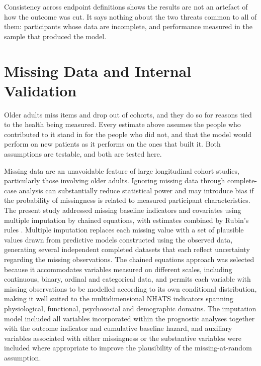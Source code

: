 \medskip
{}

\medskip
\noindent Consistency across endpoint definitions shows the results are not an artefact of how the outcome was cut. It says nothing about the two threats common to all of them: participants whose data are incomplete, and performance measured in the sample that produced the model.

\section{Missing Data and Internal Validation}
\label{sec:internal_validation_results}

\noindent Older adults miss items and drop out of cohorts, and they do so for reasons tied to the health being measured. Every estimate above assumes the people who contributed to it stand in for the people who did not, and that the model would perform on new patients as it performs on the ones that built it. Both assumptions are testable, and both are tested here.

\noindent Missing data are an unavoidable feature of large longitudinal cohort studies, particularly those involving older adults. Ignoring missing data through complete-case analysis can substantially reduce statistical power and may introduce bias if the probability of missingness is related to measured participant characteristics. The present study addressed missing baseline indicators and covariates using multiple imputation by chained equations, with estimates combined by Rubin's rules \citep{rubin_1987,vanbuuren_2011}. Multiple imputation replaces each missing value with a set of plausible values drawn from predictive models constructed using the observed data, generating several independent completed datasets that each reflect uncertainty regarding the missing observations. The chained equations approach was selected because it accommodates variables measured on different scales, including continuous, binary, ordinal and categorical data, and permits each variable with missing observations to be modelled according to its own conditional distribution, making it well suited to the multidimensional NHATS indicators spanning physiological, functional, psychosocial and demographic domains. The imputation model included all variables incorporated within the prognostic analyses together with the outcome indicator and cumulative baseline hazard, and auxiliary variables associated with either missingness or the substantive variables were included where appropriate to improve the plausibility of the missing-at-random assumption.

